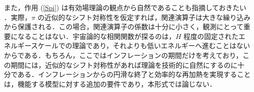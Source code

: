 また，作用 (\ref{Spi}) は有効場理論の観点から自然であることも指摘しておきたい \cite{Polchinski:1992ed}．実際，$\pi$ の近似的なシフト対称性を仮定すれば，関連演算子は大きな繰り込みから保護される．この場合，関連演算子の係数は十分に小さく，観測にとって重要になることはない．宇宙論的な相関関数が探るのは，$H$ 程度の固定されたエネルギースケールでの理論であり，それよりも低いエネルギーへ進むことはないからである．もちろん，ここではインフレーションの期間だけを考えており，この期間には，近似的なシフト対称性があれば理論を技術的に自然にするのに十分である．インフレーションからの円滑な終了と効率的な再加熱を実現することは，機能する模型に対する追加の要件であり，本形式では論じない．
